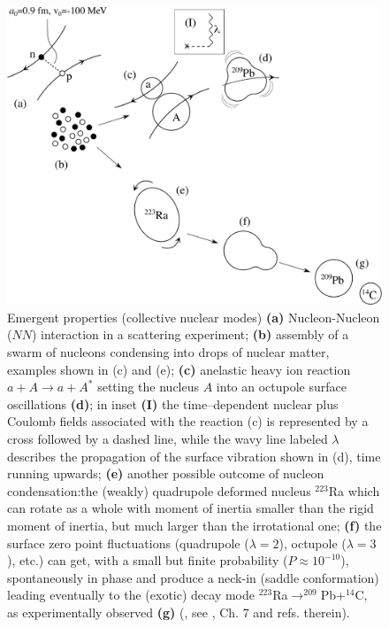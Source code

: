 \begin{figure}
	\centerline {
		\includegraphics*[width=16cm]{introduccion/figs/figpreface2x}
	}
	\caption{Emergent properties (collective nuclear modes) \textbf{(a)} Nucleon-Nucleon ($NN$) interaction in a scattering experiment; \textbf{(b)} assembly of a swarm of nucleons condensing into drops of nuclear matter, examples shown in (c) and (e); \textbf{(c)} anelastic heavy ion reaction $a+A\to a+A^*$ setting the nucleus $A$ into an octupole surface oscillations \textbf{(d)}; in inset \textbf{(I)} the time--dependent nuclear plus Coulomb fields associated with the reaction (c) is represented by a cross followed by a dashed line, while the wavy line labeled $\lambda$ describes the propagation of the surface vibration shown in (d), time running upwards; \textbf{(e)} another possible outcome of nucleon condensation:the (weakly) quadrupole deformed nucleus $^{223}$Ra which can rotate as a whole with moment of inertia smaller than the rigid moment of inertia, but much larger than the irrotational one; \textbf{(f)} the surface zero point fluctuations  (quadrupole ($\lambda=2$), octupole ($\lambda=3$), etc.) can get, with a small but finite probability ($P\approx10^{-10}$), spontaneously in phase and produce a neck-in (saddle conformation) leading eventually to the (exotic) decay mode  $^{223}$Ra$\to^{209}$Pb+$^{14}$C, as experimentally observed \textbf{(g)} (\cite{Rose:84}, see \cite{Brink:05}, Ch. 7 and refs. therein).}
	\label{fig1.0.2}
\end{figure}
